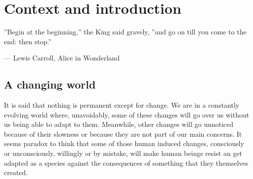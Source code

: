 

\chapter{Context and introduction\label{context}}

\epigraphfontsize{\small\itshape}
\epigraph{''Begin at the beginning,'' the King said gravely, ''and go on till you
come to the end: then stop.''}{--- \textup{Lewis Carroll}, Alice in Wonderland}

\section{A changing world} 




It is said that nothing is permanent except for change. We are in a constantly evolving world where, unavoidably, some of these changes will go over us without us  being able to adapt to them. Meanwhile, other changes will go unnoticed because of their slowness or because they are not part of our main concerns. It seems paradox to think that some of those human induced changes, consciously or unconsciously, willingly or by mistake, will make human beings resist an get adapted as a species against the consequences of something that they themselves created. 

